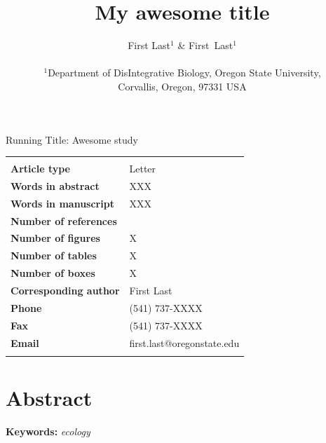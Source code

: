 \documentclass[11pt]{article}
\title{My awesome title}
\author
{First Last$^1$ \& First\ Last$^{1}$\\\\
\small{$^1$Department of DisIntegrative Biology, Oregon State University,}\\
\small{Corvallis, Oregon, 97331 USA}\\
}
\date{}
\newenvironment{ecolettabstract}{\clearpage\section*{Abstract}}{\clearpage}
\newenvironment{ecolettcover}{\maketitle}{\clearpage}
\begin{document}
\maketitle

\baselineskip30pt

 \begin{ecolettcover}

 \centerline{{\sc Running Title:} Awesome study}

 \bigskip

 \begin{center}
 \begin{tabular}{ll}
 \hline
 \\
 {\bf Article type}							 & Letter                               \\
 {\bf Words in abstract}				& XXX                                 \\
 {\bf Words in manuscript}       	 & XXX                               \\
 {\bf Number of references}			& \total{citnum}\                 \\
 {\bf Number of figures}				& X\                                  \\
 {\bf Number of tables}					& X\                                  \\
 {\bf Number of boxes}					& X\                                  \\
 {\bf Corresponding author}		   & First Last                    \\
 {\bf Phone} 								& (541) 737-XXXX               \\
 {\bf Fax} 									  & (541)  737-XXXX              \\
{\bf Email} 								& first.last@oregonstate.edu           \\
\\
 \hline
 \end{tabular}
 \end{center}

 \end{ecolettcover}



\begin{ecolettabstract}

\lipsum[1]

\noindent\textbf{Keywords:} \emph{ecology}
\end{ecolettabstract}
\end{document}
